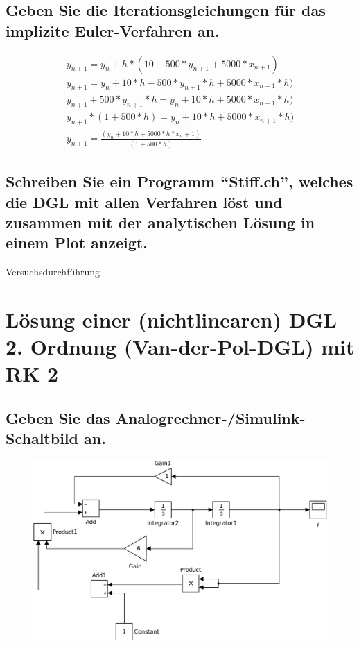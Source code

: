 \documentclass[10pt,a4paper]{article}
\begin{document}
\subsection{Geben Sie die Iterationsgleichungen für das implizite Euler-Verfahren an.}
\begin{subequations}
\begin{align}
y_{n+1} = y_n + h * (10 - 500 * y_{n+1} + 5000 * x_{n+1})\\
y_{n+1} = y_n + 10 * h - 500 * y_{n+1} * h + 5000 * x_{n+1} * h)\\
y_{n+1} + 500 * y_{n+1} * h = y_n + 10 * h + 5000 * x_{n+1} * h)\\
y_{n+1} * (1+ 500 * h) = y_n + 10 * h + 5000 * x_{n+1} * h)\\
y_{n+1} = \frac{(y_n + 10 * h + 5000 * h * x_n+1)}{ (1+500*h)}
\end{align}
\end{subequations}

\subsection{Schreiben Sie ein Programm "`Stiff.ch"', welches die DGL mit allen Verfahren
löst und zusammen mit der analytischen Lösung in einem Plot anzeigt.}

\begin{center}
\begin{large}
Versuchsdurchführung
\end{large}
\end{center}


\section{Lösung einer (nichtlinearen) DGL 2. Ordnung (Van-der-Pol-DGL) mit RK 2}
\subsection{Geben Sie das Analogrechner-/Simulink-Schaltbild an.}
\begin{figure}[h]
\centering
\includegraphics[width=0.9\linewidth]{../screenshots/2}
\end{figure}
\end{document}
